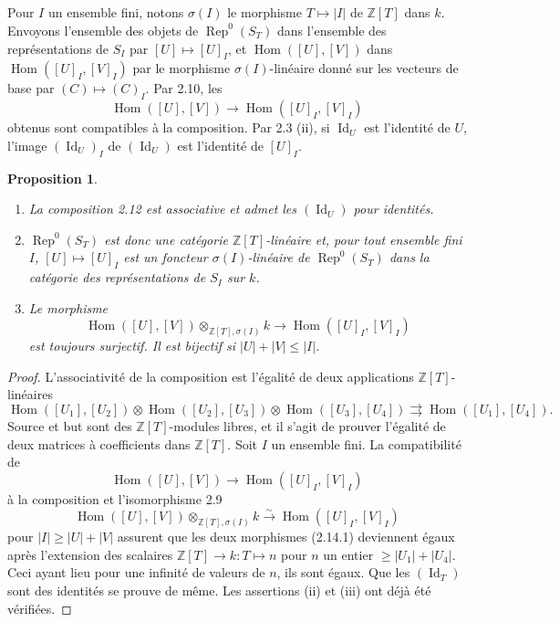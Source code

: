 \documentclass[11pt,a4paper]{article}
\theoremstyle{plain}
\newtheorem{proposition}[theorem]{Proposition}
\theoremstyle{definition}
\DeclareMathOperator{\Hom}{Hom}
\DeclareMathOperator{\Rep}{Rep}
\newcommand{\Z}{\mathbb{Z}}
\newcommand{\isom}{\xrightarrow{\sim}}
\DeclareMathOperator{\Id}{Id}
\begin{document}
\subsection{}
Pour $I$ un ensemble fini, notons $\sigma(I)$ le morphisme $T \mapsto |I|$ de $\Z[T]$ dans $k$. Envoyons l'ensemble des objets de $\Rep^0(S_T)$ dans l'ensemble des repr\'esentations de $S_I$ par $[U] \mapsto [U]_I$, et $\Hom([U], [V])$ dans $\Hom([U]_I, [V]_I)$ par le morphisme $\sigma(I)$-lin\'eaire donn\'e sur les vecteurs de base par $(C) \mapsto (C)_I$. Par 2.10, les
\[
\Hom([U], [V]) \to \Hom([U]_I, [V]_I)
\]
obtenus sont compatibles \`a la composition. Par 2.3 (ii), si $\Id_U$ est l'identit\'e de $U$, l'image $(\Id_U)_I$ de $(\Id_U)$ est l'identit\'e de $[U]_I$.

\begin{proposition}
\begin{enumerate}[label=(\roman*)]
\item La composition 2.12 est associative et admet les $(\Id_U)$ pour identit\'es.
\item $\Rep^0(S_T)$ est donc une cat\'egorie $\Z[T]$-lin\'eaire et, pour tout ensemble fini $I$, $[U] \mapsto [U]_I$ est un foncteur $\sigma(I)$-lin\'eaire de $\Rep^0(S_T)$ dans la cat\'egorie des repr\'esentations de $S_I$ sur $k$.
\item Le morphisme
\[
\Hom([U], [V]) \otimes_{\Z[T], \sigma(I)} k \to \Hom([U]_I, [V]_I)
\]
est toujours surjectif. Il est bijectif si $|U| + |V| \leq |I|$.
\end{enumerate}
\end{proposition}

\begin{proof}
L'associativit\'e de la composition est l'\'egalit\'e de deux applications $\Z[T]$-lin\'eaires
\begin{equation}
\Hom([U_1], [U_2]) \otimes \Hom([U_2], [U_3]) \otimes \Hom([U_3], [U_4]) \rightrightarrows \Hom([U_1], [U_4]). \tag{2.14.1}
\end{equation}
Source et but sont des $\Z[T]$-modules libres, et il s'agit de prouver l'\'egalit\'e de deux matrices \`a coefficients dans $\Z[T]$. Soit $I$ un ensemble fini. La compatibilit\'e de
\[
\Hom([U], [V]) \to \Hom([U]_I, [V]_I)
\]
\`a la composition et l'isomorphisme 2.9
\[
\Hom([U], [V]) \otimes_{\Z[T], \sigma(I)} k \isom \Hom([U]_I, [V]_I)
\]
pour $|I| \geq |U| + |V|$ assurent que les deux morphismes (2.14.1) deviennent \'egaux apr\`es l'extension des scalaires $\Z[T] \to k : T \mapsto n$ pour $n$ un entier $\geq |U_1| + |U_4|$. Ceci ayant lieu pour une infinit\'e de valeurs de $n$, ils sont \'egaux. Que les $(\Id_T)$ sont des identit\'es se prouve de m\^eme. Les assertions (ii) et (iii) ont d\'ej\`a \'et\'e v\'erifi\'ees.
\end{proof}
\end{document}
